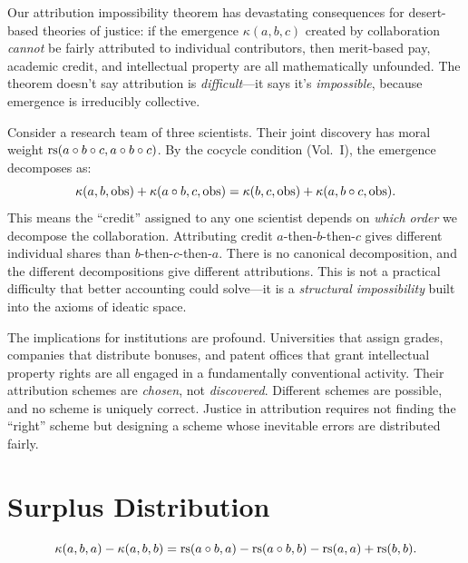 \begin{interpretation}
Our attribution impossibility theorem has devastating consequences for
desert-based theories of justice: if the emergence $\kappa(a,b,c)$
created by collaboration \emph{cannot} be fairly attributed to individual
contributors, then merit-based pay, academic credit, and intellectual
property are all mathematically unfounded. The theorem doesn't say
attribution is \emph{difficult}---it says it's \emph{impossible}, because
emergence is irreducibly collective.

Consider a research team of three scientists. Their joint discovery has
moral weight $\mathrm{rs}(a \circ b \circ c, a \circ b \circ c)$.
By the cocycle condition (Vol.~I), the emergence decomposes as:
\[
  \kappa(a, b, \mathrm{obs}) + \kappa(a \circ b, c, \mathrm{obs})
  = \kappa(b, c, \mathrm{obs}) + \kappa(a, b \circ c, \mathrm{obs}).
\]
This means the ``credit'' assigned to any one scientist depends on
\emph{which order} we decompose the collaboration. Attributing credit
$a$-then-$b$-then-$c$ gives different individual shares than
$b$-then-$c$-then-$a$. There is no canonical decomposition, and the
different decompositions give different attributions. This is not a
practical difficulty that better accounting could solve---it is a
\emph{structural impossibility} built into the axioms of ideatic space.

The implications for institutions are profound. Universities that assign
grades, companies that distribute bonuses, and patent offices that grant
intellectual property rights are all engaged in a fundamentally
conventional activity. Their attribution schemes are \emph{chosen}, not
\emph{discovered}. Different schemes are possible, and no scheme is
uniquely correct. Justice in attribution requires not finding the
``right'' scheme but designing a scheme whose inevitable errors are
distributed fairly.
\end{interpretation}

\section{Surplus Distribution}

\begin{theorem}
\label{thm:surplus-asymmetry}
\[
  \kappa(a, b, a) - \kappa(a, b, b) = \mathrm{rs}(a \circ b, a) - \mathrm{rs}(a \circ b, b) - \mathrm{rs}(a, a) + \mathrm{rs}(b, b).
\]
\end{theorem}


